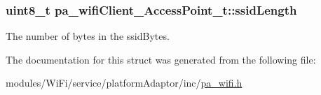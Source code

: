 \subsubsection[{\texorpdfstring{ssid\+Length}{ssidLength}}]{\setlength{\rightskip}{0pt plus 5cm}uint8\+\_\+t pa\+\_\+wifi\+Client\+\_\+\+Access\+Point\+\_\+t\+::ssid\+Length}\hypertarget{structpa__wifi_client___access_point__t_a58dc48bb34bb5bb57460b29c20612e84}{}\label{structpa__wifi_client___access_point__t_a58dc48bb34bb5bb57460b29c20612e84}


The number of bytes in the ssid\+Bytes. 



The documentation for this struct was generated from the following file\+:\begin{DoxyCompactItemize}
\item 
modules/\+Wi\+Fi/service/platform\+Adaptor/inc/\hyperlink{pa__wifi_8h}{pa\+\_\+wifi.\+h}\end{DoxyCompactItemize}
